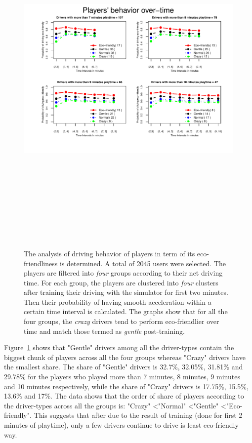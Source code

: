 \documentclass[preprint,authoryear,12pt]{elsarticle}
\begin{document}
\begin{figure}[!htb]
	\centering
	\includegraphics[trim = 10mm 13mm -15mm 10mm, width=20.0cm,height=18.0cm]{ijhcs14-img/Evolution.pdf}
	\caption{The analysis of driving behavior of players in term of its eco-friendliness is determined. A total of 2045 users were selected. The players are filtered into \textit{four} groups according to their net driving time. For each group, the players are clustered into \textit{four} clusters after training their driving with the simulator for first two minutes. Then their probability of having smooth acceleration within a certain time interval is calculated. The graphs show that for all the four groups, the \emph{crazy} drivers tend to perform eco-friendlier over time and match those termed as \textit{gentle} post-training. 
	}
	\label{fig:evolution}
\end{figure}

Figure~\ref{fig:evolution} shows that "Gentle" drivers among all the driver-types contain the biggest chunk of players across all the four groups whereas "Crazy" drivers have the smallest share. The share of "Gentle" drivers is 32.7\%, 32.05\%, 31.81\% and 29.78\% for the players who played more than 7 minutes, 8 minutes, 9 minutes and 10 minutes respectively, while the share of "Crazy" drivers is 17.75\%, 15.5\%, 13.6\% and 17\%. The data shows that the order of share of players according to the driver-types across all the groups is:  "Crazy" \textless "Normal" \textless "Gentle" \textless "Eco-friendly". This suggests that after due to the result of training (done for first 2 minutes of playtime), only a few drivers continue to drive is least eco-friendly way. 
\end{document}
